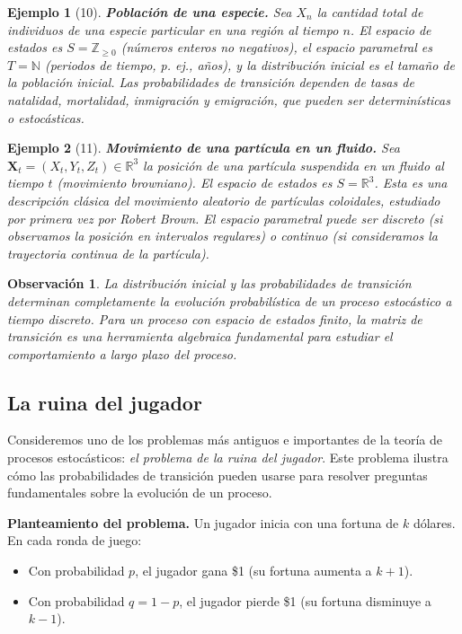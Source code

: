 \documentclass[12pt]{book}
\newtheorem{example}{Ejemplo}[chapter]
\newtheorem{remark}{Observación}[chapter]
\begin{document}
\begin{example}[10]
\textbf{Población de una especie.} Sea $X_n$ la cantidad total de individuos de una especie particular en una región al tiempo $n$. El espacio de estados es $S = \mathbb{Z}_{\geq 0}$ (números enteros no negativos), el espacio parametral es $T = \mathbb{N}$ (periodos de tiempo, p. ej., años), y la distribución inicial es el tamaño de la población inicial. Las probabilidades de transición dependen de tasas de natalidad, mortalidad, inmigración y emigración, que pueden ser determinísticas o estocásticas.
\end{example}

\begin{example}[11]
\textbf{Movimiento de una partícula en un fluido.} Sea $\mathbf{X}_t = (X_t, Y_t, Z_t) \in \mathbb{R}^3$ la posición de una partícula suspendida en un fluido al tiempo $t$ (movimiento browniano). El espacio de estados es $S = \mathbb{R}^3$. Esta es una descripción clásica del movimiento aleatorio de partículas coloidales, estudiado por primera vez por Robert Brown. El espacio parametral puede ser discreto (si observamos la posición en intervalos regulares) o continuo (si consideramos la trayectoria continua de la partícula).
\end{example}

\begin{remark}
La distribución inicial y las probabilidades de transición determinan completamente la evolución probabilística de un proceso estocástico a tiempo discreto. Para un proceso con espacio de estados finito, la matriz de transición es una herramienta algebraica fundamental para estudiar el comportamiento a largo plazo del proceso.
\end{remark}

\subsection*{La ruina del jugador}

Consideremos uno de los problemas más antiguos e importantes de la teoría de procesos estocásticos: \textit{el problema de la ruina del jugador}. Este problema ilustra cómo las probabilidades de transición pueden usarse para resolver preguntas fundamentales sobre la evolución de un proceso.

\textbf{Planteamiento del problema.} Un jugador inicia con una fortuna de $k$ dólares. En cada ronda de juego:
\begin{itemize}
    \item Con probabilidad $p$, el jugador gana \$1 (su fortuna aumenta a $k+1$).
    \item Con probabilidad $q = 1 - p$, el jugador pierde \$1 (su fortuna disminuye a $k-1$).
\end{itemize}
\end{document}
